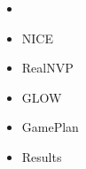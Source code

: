 \begin{frame}
\begin{itemize}
    \item \textbf{\color{red}{What are Normalizing Flows}}
    \item NICE
    \item RealNVP
    \item GLOW
    \item GamePlan
    \item Results
\end{itemize}
\end{frame}
